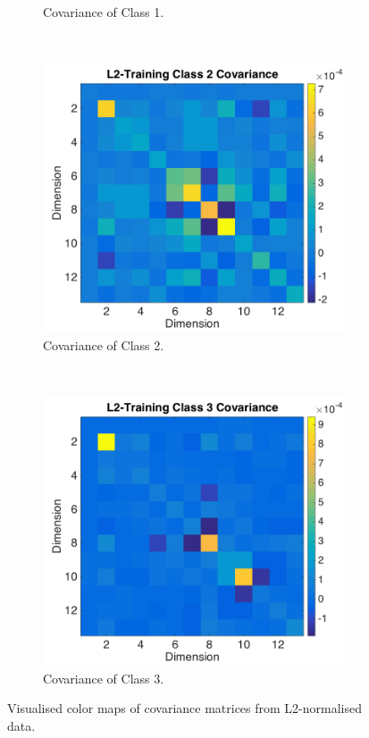 \documentclass[a4paper, 10pt, conference]{ieeeconf}
\begin{document}
\begin{figure}[!ht]
\begin{subfigure}{0.45\textwidth}
      \caption{Covariance of Class 1.}
      \label{fig:covl2class1}
    \end{subfigure}
    \\
    \begin{subfigure}{0.45\textwidth}
      \includegraphics[width=\textwidth]{pic/covl2class2.png}
      \caption{Covariance of Class 2.}
      \label{fig:covl2class2}
    \end{subfigure}
    ~
    \begin{subfigure}{0.45\textwidth}
      \includegraphics[width=\textwidth]{pic/covl2class3.png}
      \caption{Covariance of Class 3.}
      \label{fig:covl2class3}
    \end{subfigure}
	\caption{Visualised color maps of covariance matrices from L2-normalised data.}
  \label{fig:covl2all}
\end{figure}
\newpage
\end{document}
